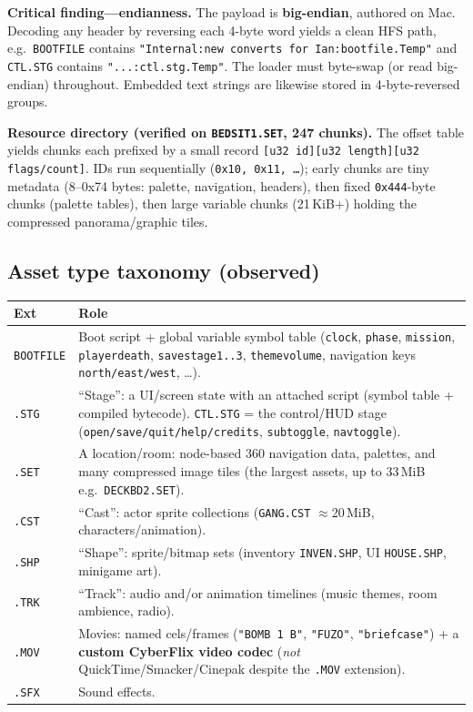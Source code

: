\documentclass[11pt]{article}
\newcommand{\code}[1]{\texttt{#1}}
\begin{document}
\noindent\textbf{Critical finding---endianness.} The payload is \textbf{big-endian},
authored on Mac. Decoding any header by reversing each 4-byte word yields a clean
HFS path, e.g.\ \code{BOOTFILE} contains
\code{"Internal:new converts for Ian:bootfile.Temp"} and \code{CTL.STG} contains
\code{"...:ctl.stg.Temp"}. The loader must byte-swap (or read big-endian)
throughout. Embedded text strings are likewise stored in 4-byte-reversed groups.

\noindent\textbf{Resource directory (verified on \code{BEDSIT1.SET}, 247 chunks).}
The offset table yields chunks each prefixed by a small record
\code{[u32 id][u32 length][u32 flags/count]}. IDs run sequentially
(\code{0x10, 0x11, \dots}); early chunks are tiny metadata (8--0x74 bytes:
palette, navigation, headers), then fixed \code{0x444}-byte chunks (palette
tables), then large variable chunks (21\,KiB+) holding the compressed
panorama/graphic tiles.

\subsection{Asset type taxonomy (observed)}
\begin{longtable}{@{}lp{11.5cm}@{}}
\toprule
Ext & Role \\
\midrule
\code{BOOTFILE} & Boot script + global variable symbol table (\code{clock},
  \code{phase}, \code{mission}, \code{playerdeath}, \code{savestage1..3},
  \code{themevolume}, navigation keys \code{north/east/west}, \dots). \\
\code{.STG} & ``Stage'': a UI/screen state with an attached script (symbol table
  + compiled bytecode). \code{CTL.STG} = the control/HUD stage
  (\code{open/save/quit/help/credits}, \code{subtoggle}, \code{navtoggle}). \\
\code{.SET} & A location/room: node-based 360\textdegree{} navigation data,
  palettes, and many compressed image tiles (the largest assets, up to 33\,MiB
  e.g.\ \code{DECKBD2.SET}). \\
\code{.CST} & ``Cast'': actor sprite collections (\code{GANG.CST} $\approx$20\,MiB,
  characters/animation). \\
\code{.SHP} & ``Shape'': sprite/bitmap sets (inventory \code{INVEN.SHP}, UI
  \code{HOUSE.SHP}, minigame art). \\
\code{.TRK} & ``Track'': audio and/or animation timelines (music themes, room
  ambience, radio). \\
\code{.MOV} & Movies: named cels/frames (\code{"BOMB 1 B"}, \code{"FUZO"},
  \code{"briefcase"}) + a \textbf{custom CyberFlix video codec} (\emph{not}
  QuickTime/Smacker/Cinepak despite the \code{.MOV} extension). \\
\code{.SFX} & Sound effects. \\
\bottomrule
\end{longtable}
\end{document}
